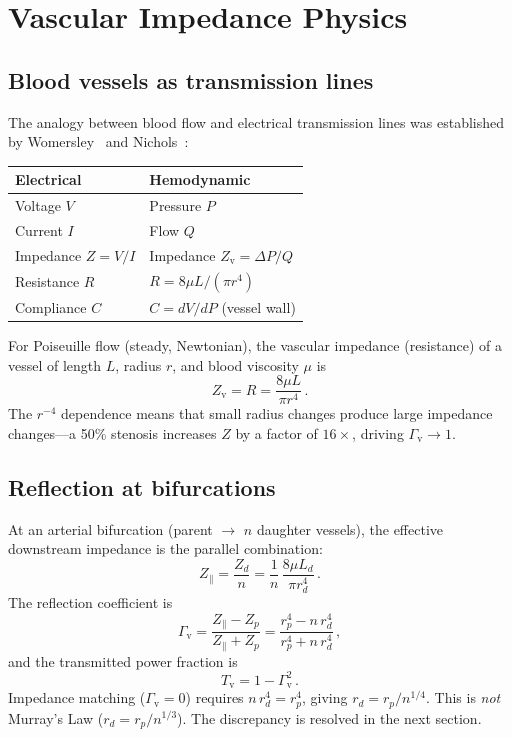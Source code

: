 ﻿\documentclass[aps,pre,twocolumn,superscriptaddress,floatfix]{revtex4-2}
\newcommand{\Gv}{\Gamma_{\mathrm{v}}}
\newcommand{\Tv}{T_{\mathrm{v}}}
\newcommand{\Zv}{Z_{\mathrm{v}}}
\begin{document}
\section{Vascular Impedance Physics}\label{sec:physics}

\subsection{Blood vessels as transmission lines}

The analogy between blood flow and electrical transmission
lines was established by Womersley~\cite{womersley1955}
and Nichols~\cite{nichols2011}:
\begin{center}
\begin{tabular}{ll}
\hline
\textbf{Electrical} & \textbf{Hemodynamic} \\
\hline
Voltage $V$ & Pressure $P$ \\
Current $I$ & Flow $Q$ \\
Impedance $Z = V/I$ & Impedance $\Zv = \Delta P / Q$ \\
Resistance $R$ & $R = 8\mu L / (\pi r^4)$ \\
Compliance $C$ & $C = dV/dP$ (vessel wall) \\
\hline
\end{tabular}
\end{center}
For Poiseuille flow (steady, Newtonian), the vascular
impedance (resistance) of a vessel of length $L$, radius
$r$, and blood viscosity $\mu$ is
\begin{equation}\label{eq:poiseuille}
  \Zv = R = \frac{8\mu L}{\pi r^4}\,.
\end{equation}
The $r^{-4}$ dependence means that small radius changes
produce large impedance changes---a 50\% stenosis
increases $Z$ by a factor of $16\times$, driving
$\Gv \to 1$.


\subsection{Reflection at bifurcations}

At an arterial bifurcation (parent $\to$ $n$ daughter
vessels), the effective downstream impedance is the
parallel combination:
\begin{equation}\label{eq:zparallel}
  Z_{\|}  = \frac{Z_d}{n}
           = \frac{1}{n}\,\frac{8\mu L_d}{\pi r_d^4}\,.
\end{equation}
The reflection coefficient is
\begin{equation}\label{eq:gamma_bif}
  \Gv = \frac{Z_{\|} - Z_p}{Z_{\|} + Z_p}
      = \frac{r_p^4 - n\,r_d^4}{r_p^4 + n\,r_d^4}\,,
\end{equation}
and the transmitted power fraction is
\begin{equation}
  \Tv = 1 - \Gv^2\,.
\end{equation}
Impedance matching ($\Gv = 0$) requires $n\,r_d^4 = r_p^4$,
giving $r_d = r_p / n^{1/4}$.
This is \emph{not} Murray's Law ($r_d = r_p / n^{1/3}$).
The discrepancy is resolved in the next section.
\end{document}
